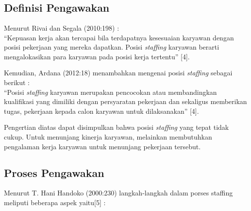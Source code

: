 \chapter{\babDua}


\section{Definisi Pengawakan}

Menurut Rivai dan Segala (2010:198) :
\\
“Kepuasan kerja akan tercapai bila terdapatnya kesesuaian karyawan dengan posisi pekerjaan yang mereka dapatkan. Posisi \textit{staffing} karyawan berarti mengalokasikan para karyawan pada posisi kerja tertentu” [4].

Kemudian, Ardana (2012:18) menambahkan mengenai posisi \textit{staffing} sebagai berikut : 
\\
“Posisi \textit{staffing} karyawan merupakan pencocokan atau membandingkan kualifikasi yang dimiliki dengan persyaratan pekerjaan dan sekaligus memberikan tugas, pekerjaan kepada calon karyawan untuk dilaksanakan” [4].

Pengertian diatas dapat disimpulkan bahwa posisi \textit{staffing}  yang tepat tidak cukup. Untuk menunjang kinerja karyawan, melainkan membutuhkan pengalaman kerja karyawan untuk menunjang pekerjaan tersebut.  




\section{Proses Pengawakan}

Menurut T. Hani Handoko (2000:230) langkah-langkah dalam porses staffing meliputi beberapa aspek yaitu[5] : 


